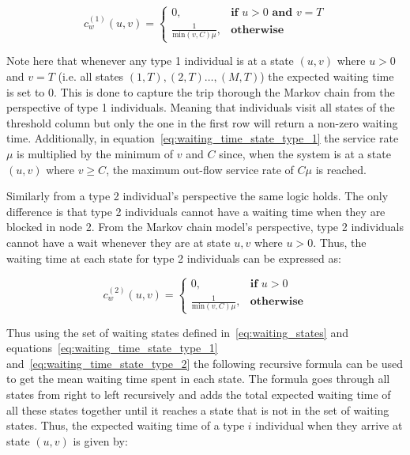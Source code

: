\begin{equation}\label{eq:waiting_time_state_type_1}
    c^{(1)}_w(u,v) =
    \begin{cases}
        0, & \textbf{if } u > 0 \textbf{ and } v = T \\
        \frac{1}{\text{min}(v,C)\mu}, & \textbf{otherwise}
    \end{cases}
\end{equation}

Note here that whenever any type 1 individual is at a state \((u,v)\) where
\(u > 0\) and \(v = T\) (i.e. all states \((1,T), (2,T) \dots, (M,T)\)) the
expected waiting time is set to \(0\).
This is done to capture the trip thorough the Markov chain from the perspective
of type 1 individuals.
Meaning that individuals visit all states of the threshold column but only the
one in the first row will return a non-zero waiting time.
Additionally, in equation~\eqref{eq:waiting_time_state_type_1} the service rate
\(\mu\) is multiplied by the minimum of \(v\) and \(C\) since, when the system
is at a state \((u,v)\) where \(v \geq C\), the maximum out-flow service rate
of \( C \mu \) is reached.


Similarly from a type 2 individual's perspective the same logic holds.
The only difference is that type 2 individuals cannot have a waiting time when
they are blocked in node 2.
From the Markov chain model's perspective, type 2 individuals cannot have a wait
whenever they are at state \(u, v\) where \(u > 0\).
Thus, the waiting time at each state for type 2 individuals can be expressed as:

\begin{equation}\label{eq:waiting_time_state_type_2}
    c^{(2)}_w(u,v) =
    \begin{cases}
        0, & \textbf{if } u > 0 \\
        \frac{1}{\text{min}(v, C)\mu}, & \textbf{otherwise}
    \end{cases}
\end{equation}


Thus using the set of waiting states defined in~\eqref{eq:waiting_states} and
equations~\eqref{eq:waiting_time_state_type_1}
and~\eqref{eq:waiting_time_state_type_2} the following recursive formula can be
used to get the mean waiting time spent in each state.
The formula goes through all states from right to left recursively and adds the
total expected waiting time of all these states together until it reaches a
state that is not in the set of waiting states.
Thus, the expected waiting time of a type \(i\) individual when they arrive at
state \( (u,v) \) is given by:

